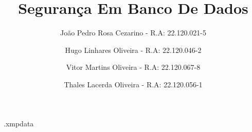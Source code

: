 
\begin{filecontents*}{\jobname.xmpdata}
\end{filecontents*}

\documentclass[acronym,symbols,sublist]{fei}
\usepackage[backend=biber]{biblatex}
\usepackage[utf8]{inputenc}

\author{João Pedro Rosa Cezarino - R.A: 22.120.021-5\and Hugo Linhares Oliveira - R.A: 22.120.046-2\and Vitor Martins Oliveira - R.A: 22.120.067-8\and Thales Lacerda Oliveira - R.A: 22.120.056-1}
\title{Segurança Em Banco De Dados}





\makeindex

\makeglossaries



\maketitle

\tableofcontents

\chapter{Introdução}

O tema escolhido pelo grupo é “Segurança em Banco de Dados”. Tema este, que discorre acerca da segurança durante o uso, configuração e desenvolvimento dos mais diversos modelos de bancos de dados existentes atualmente. À medida que as grandes empresas aumentam sua confiança em sistemas distribuídos, elas, consequentemente, tornam-se cada vez mais vulneráveis à falhas de segurança, ainda que haja um aumento na produtividade e eficiência nas atividades do dia a dia.

